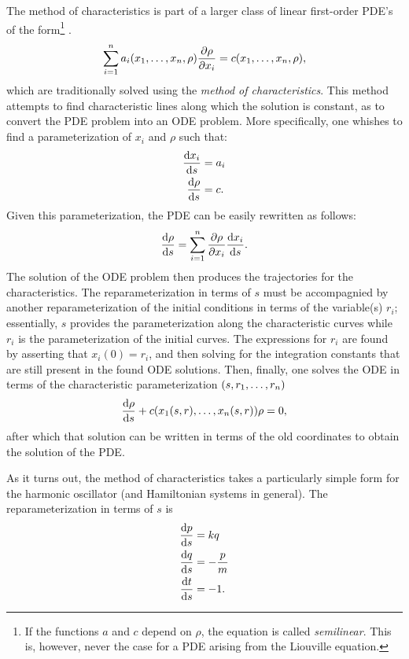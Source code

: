 \begin{aside}{The method of characteristics}
     is part of a larger class of linear first-order PDE's of the form\footnote{If the functions $a$ and $c$ depend on $\rho$, the equation is called \emph{semilinear}. This is, however, never the case for a PDE arising from the Liouville equation.} \cite[p. 207]{Farlow1989}.
    \begin{equation}
        \sum_{i=1}^n a_i(x_1, \ldots, x_n, \rho) \pdv{\rho}{x_i} = c(x_1, \ldots, x_n, \rho),
    \end{equation}
    which are traditionally solved using the \emph{method of characteristics}. This method attempts to find characteristic lines along which the solution is constant, as to convert the PDE problem into an ODE problem. More specifically, one whishes to find a parameterization of $x_i$ and $\rho$ such that:
    \begin{equation}
        \begin{split}
            \dv{x_i}{s} &= a_i\\
            \dv{\rho}{s} &= c.
        \end{split}
    \end{equation}
    Given this parameterization, the PDE can be easily rewritten as follows: \cite{Farlow1989}
    $$ \dv{\rho}{s} = \sum_{i = 1}^n \pdv{\rho}{x_i}\dv{x_i}{s}. $$
    The solution of the ODE problem then produces the trajectories for the characteristics. The reparameterization in terms of $s$ must be accompagnied by another reparameterization of the initial conditions in terms of the variable(s) $r_i$; essentially, $s$ provides the parameterization along the characteristic curves while $r_i$ is the parameterization of the initial curves. The expressions for $r_i$ are found by asserting that $x_i(0) = r_i$, and then solving for the integration constants that are still present in the found ODE solutions. Then, finally, one solves the ODE in terms of the characteristic parameterization $\qty(s, r_1, \ldots, r_n)$
    $$ \dv{\rho}{s} + c\qty(x_1(s, r), \ldots, x_n(s, r))\rho = 0, $$
    after which that solution can be written in terms of the old coordinates to obtain the solution of the PDE.

\end{aside}
As it turns out, the method of characteristics takes a particularly simple form for the harmonic oscillator (and Hamiltonian systems in general). The reparameterization in terms of $s$ is
\begin{equation}
    \begin{split}
        \dv{p}{s} &= kq \\
        \dv{q}{s} &= -\frac{p}{m}\\
        \dv{t}{s} &= -1.
    \end{split}
\end{equation}
